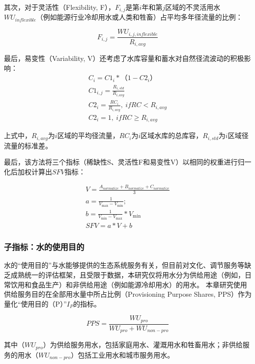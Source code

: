 其次，对于灵活性（Flexibility, F），$F_{i, j}$是第$i$年和第$j$区域的不灵活用水$WU_{inflexible}$（例如能源行业冷却用水或人类和牲畜）占平均多年径流量的比例：

\begin{equation}
    F_{i, j} = \frac{WU_{i, j, inflexible}}{R_{i, avg}}
\end{equation}

最后，易变性（Variability, V）还考虑了水库容量和蓄水对自然径流波动的积极影响：
\begin{gather}
    C_i = C1_i * （1 - C2_i） \\
    C1_{i, j} = \frac{R_{i, std}}{R_{i, avg}} \\
    C2_{i} = \frac{RC_{i}}{R_{i, avg}}, \ if RC < R_{i, avg} \\
    C2_{i} = 1, \ if RC \geq  R_{i, avg}
\end{gather}

上式中，$R_{i, avg}$为$i$区域的平均径流量，$RC_i$为$i$区域水库的总库容，$R_{i, std}$为$i$区域径流量的标准差。

最后，该方法将三个指标（稀缺性S、灵活性F和易变性V）以相同的权重进行归一化后加权计算出$SFV$指标：

\begin{gather}
    V = \frac{A_{normalize} + B_{normalize} + C_{normalize}}{3}\\
    a = \frac{1}{V_{\max} - V_{\min}};\\
    b = \frac{1}{V_{\min} - V_{\max}} * V_{\min}\\
    SFV = a * V + b
\end{gather}


\subsubsection{子指标：水的使用目的}

水的``使用目的''与水能够提供的生态系统服务有关，但目前对文化、调节服务等缺乏成熟统一的评估框架，且受限于数据，本研究仅将用水分为供给用途（例如，日常饮用和食品生产）和非供给用途（例如能源冷却用水）的用水\cite{liu2017,florke2018,jaeger2019}。
本章研究使用供给服务目的在全部用水量中所占比例（Provisioning Purpose Shares, PPS）作为量化``使用目的（P）''$I_P$的指标。

\begin{equation}
    PPS = \frac{WU_{pro}}{WU_{pro} + WU_{non-pro}}
\label{ch4:eq:priority}
\end{equation}

其中（$WU_{pro}$）为供给服务用水，包括家庭用水、灌溉用水和牲畜用水；非供给服务的用水（$WU_{non-pro}$）包括工业用水和城市服务用水。

